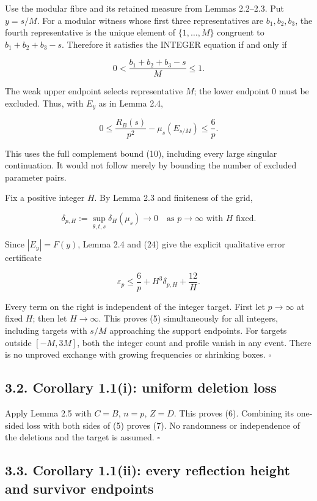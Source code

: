 \documentclass[11pt,a4paper]{article}
\begin{document}
Use the modular fibre and its retained measure from Lemmas 2.2--2.3. Put \(y=s/M\). For a modular witness whose first three representatives are \(b_1,b_2,b_3\), the fourth representative is the unique element of \(\{1,\ldots,M\}\) congruent to \(b_1+b_2+b_3-s\). Therefore it satisfies the INTEGER equation if and only if

\[0<\frac{b_1+b_2+b_3-s}{M}\le1.
\tag{23}\]

The weak upper endpoint selects representative \(M\); the lower endpoint 0 must be excluded. Thus, with \(E_y\) as in Lemma 2.4,

\[0\le\frac{R_B(s)}{p^2}-\mu_s(E_{s/M})\le\frac6p.
\tag{24}\]

This uses the full complement bound (10), including every large singular continuation. It would not follow merely by bounding the number of excluded parameter pairs.

Fix a positive integer \(H\). By Lemma 2.3 and finiteness of the grid,

\[\delta_{p,H}:=\sup_{\theta,t,s}\delta_H(\mu_s)\longrightarrow0
\quad\text{as }p\to\infty\text{ with }H\text{ fixed}.\]

Since \(|E_y|=F(y)\), Lemma 2.4 and (24) give the explicit qualitative error certificate

\[\varepsilon_p\le\frac6p+H^3\delta_{p,H}+\frac{12}{H}.
\tag{25}\]

Every term on the right is independent of the integer target. First let \(p\to\infty\) at fixed \(H\); then let \(H\to\infty\). This proves (5) simultaneously for all integers, including targets with \(s/M\) approaching the support endpoints. For targets outside \([-M,3M]\), both the integer count and profile vanish in any event. There is no unproved exchange with growing frequencies or shrinking boxes. \hfill\(\square\)

\subsection{3.2. Corollary 1.1(i): uniform deletion loss}\label{corollary-1.1i-uniform-deletion-loss}

Apply Lemma 2.5 with \(C=B\), \(n=p\), \(Z=D\). This proves (6). Combining its one-sided loss with both sides of (5) proves (7). No randomness or independence of the deletions and the target is assumed. \hfill\(\square\)

\subsection{3.3. Corollary 1.1(ii): every reflection height and survivor endpoints}\label{corollary-1.1ii-every-reflection-height-and-survivor-endpoints}
\end{document}
